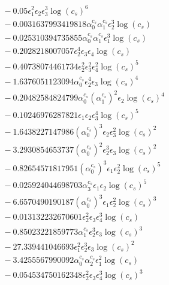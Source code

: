 \documentclass[10pt]{article}
\begin{document}
\begin{align*}
&{}  - 0.05 \epsilon_{1}^{2} \epsilon_{2} \epsilon_{3}^{3} \log{\left(c_{s} \right)}^{6} \\
&{}  - 0.0031637993419818 \alpha_{0}^{c_s} \alpha_{1}^{c_s} \epsilon_{2}^{3} \log{\left(c_{s} \right)} \\
&{}  - 0.025310394735855 \alpha_{0}^{c_s} \alpha_{1}^{c_s} \epsilon_{1}^{3} \log{\left(c_{s} \right)} \\
&{}  - 0.2028218007057 \epsilon_{2}^{4} \epsilon_{3} \epsilon_{4} \log{\left(c_{s} \right)} \\
&{}  - 0.40738074461734 \epsilon_{2}^{2} \epsilon_{3}^{2} \epsilon_{4}^{2} \log{\left(c_{s} \right)}^{5} \\
&{}  - 1.6376051123094 \alpha_{0}^{c_s} \epsilon_{2}^{4} \epsilon_{3} \log{\left(c_{s} \right)}^{4} \\
&{}  - 0.20482584824799 \alpha_{0}^{c_s} \left(\alpha_{1}^{c_s}\right)^{2} \epsilon_{2} \log{\left(c_{s} \right)}^{4} \\
&{}  - 0.10246976287821 \epsilon_{1} \epsilon_{2} \epsilon_{3}^{4} \log{\left(c_{s} \right)}^{5} \\
&{}  - 1.6438227147986 \left(\alpha_{0}^{c_s}\right)^{3} \epsilon_{2} \epsilon_{3}^{2} \log{\left(c_{s} \right)}^{2} \\
&{}  - 3.2930854653737 \left(\alpha_{0}^{c_s}\right)^{2} \epsilon_{2}^{3} \epsilon_{3} \log{\left(c_{s} \right)}^{2} \\
&{}  - 0.82654571817951 \left(\alpha_{0}^{c_s}\right)^{3} \epsilon_{1} \epsilon_{2}^{2} \log{\left(c_{s} \right)}^{5} \\
&{}  - 0.025924044698703 \alpha_{3}^{c_s} \epsilon_{1} \epsilon_{2} \log{\left(c_{s} \right)}^{5} \\
&{}  - 6.6570490190187 \left(\alpha_{0}^{c_s}\right)^{3} \epsilon_{1} \epsilon_{2}^{2} \log{\left(c_{s} \right)}^{3} \\
&{}  - 0.013132232670601 \epsilon_{2}^{2} \epsilon_{3} \epsilon_{4}^{3} \log{\left(c_{s} \right)} \\
&{}  - 0.85023221859773 \alpha_{1}^{c_s} \epsilon_{2}^{3} \epsilon_{3} \log{\left(c_{s} \right)}^{3} \\
&{}  - 27.339441046693 \epsilon_{1}^{2} \epsilon_{2}^{3} \epsilon_{3} \log{\left(c_{s} \right)}^{2} \\
&{}  - 3.4255567990092 \alpha_{0}^{c_s} \alpha_{2}^{c_s} \epsilon_{1}^{2} \log{\left(c_{s} \right)} \\
&{}  - 0.054534750162348 \epsilon_{2}^{2} \epsilon_{3} \epsilon_{4}^{3} \log{\left(c_{s} \right)}^{3} \\

\end{align*}
\end{document}
